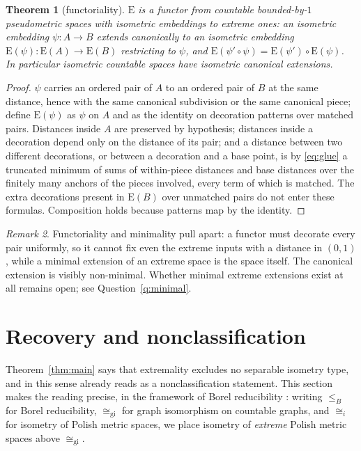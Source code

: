 \documentclass[11pt]{article}
\newtheorem{theorem}{Theorem}[section]
\theoremstyle{definition}
\theoremstyle{remark}
\newtheorem{remark}[theorem]{Remark}
\newcommand{\E}{\mathrm{E}}
\newcommand{\GI}{\cong_{\mathrm{gi}}}
\newcommand{\isoi}{\cong_i}
\newcommand{\leB}{\leq_B}
\begin{document}
\begin{theorem}[functoriality]\label{thm:functor}
$\E$ is a functor from countable bounded-by-$1$ pseudometric spaces with isometric
embeddings to extreme ones: an isometric embedding $\psi\colon A\to B$ extends canonically
to an isometric embedding $\E(\psi)\colon\E(A)\to\E(B)$ restricting to $\psi$, and
$\E(\psi'\circ\psi)=\E(\psi')\circ\E(\psi)$. In particular isometric countable spaces have
isometric canonical extensions.
\end{theorem}

\begin{proof}
$\psi$ carries an ordered pair of $A$ to an ordered pair of $B$ at the same distance, hence
with the same canonical subdivision or the same canonical piece; define $\E(\psi)$ as
$\psi$ on $A$ and as the identity on decoration patterns over matched pairs. Distances
inside $A$ are preserved by hypothesis; distances inside a decoration depend only on the
distance of its pair; and a distance between two different decorations, or between a
decoration and a base point, is by \eqref{eq:glue} a truncated minimum of sums of
within-piece distances and base distances over the finitely many anchors of the pieces
involved, every term of which is matched. The extra decorations present in $\E(B)$ over
unmatched pairs do not enter these formulas. Composition holds because patterns map by the
identity.
\end{proof}

\begin{remark}\label{rem:minimality}
Functoriality and minimality pull apart: a functor must decorate every pair uniformly, so
it cannot fix even the extreme inputs with a distance in $(0,1)$, while a minimal extension
of an extreme space is the space itself. The canonical extension is visibly non-minimal.
Whether minimal extreme extensions exist at all remains open;
see Question~\ref{q:minimal}.
\end{remark}

\section{Recovery and nonclassification}
\label{sec:nonclass}

Theorem~\ref{thm:main} says that extremality excludes no separable isometry type, and in
this sense already reads as a nonclassification statement. This section makes the reading
precise, in the framework of Borel reducibility \cite{GaoKechris03,Hjorth00}: writing
$\leB$ for Borel reducibility, $\GI$ for graph isomorphism on countable graphs, and
$\isoi$ for isometry of Polish metric spaces, we place isometry of \emph{extreme} Polish
metric spaces above $\GI$.
\end{document}
